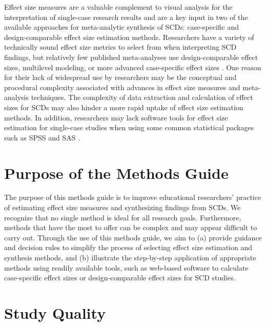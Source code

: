 \documentclass[
]{book}
\begin{document}
Effect size measures are a valuable complement to visual analysis for the interpretation of single-case research results and are a key input in two of the available approaches for meta-analytic synthesis of SCDs: case-specific and design-comparable effect size estimation methods.
Researchers have a variety of technically sound effect size metrics to select from when interpreting SCD findings, but relatively few published meta-analyses use design-comparable effect sizes, multilevel modeling, or more advanced case-specific effect sizes \citep[cf.][]{barton2017TechnologyAided, jamshidi2018Methodological, Maggin2017meta-analysis}.
One reason for their lack of widespread use by researchers may be the conceptual and procedural complexity associated with advances in effect size measures and meta-analysis techniques.
The complexity of data extraction and calculation of effect sizes for SCDs may also hinder a more rapid uptake of effect size estimation methods.
In addition, researchers may lack software tools for effect size estimation for single-case studies when using some common statistical packages such as SPSS and SAS \citep{odom2018Betweencase, Shadish2013d, shadish2015Role}.

\hypertarget{purpose-of-the-methods-guide}{%
\section{Purpose of the Methods Guide}\label{purpose-of-the-methods-guide}}

The purpose of this methods guide is to improve educational researchers' practice of estimating effect size measures and synthesizing findings from SCDs.
We recognize that no single method is ideal for all research goals.
Furthermore, methods that have the most to offer can be complex and may appear difficult to carry out.
Through the use of this methods guide, we aim to
(a) provide guidance and decision rules to simplify the process of selecting effect size estimation and synthesis methods, and
(b) illustrate the step-by-step application of appropriate methods using readily available tools, such as web-based software to calculate case-specific effect sizes or design-comparable effect sizes for SCD studies.

\hypertarget{study-quality}{%
\section{Study Quality}\label{study-quality}}
\end{document}
